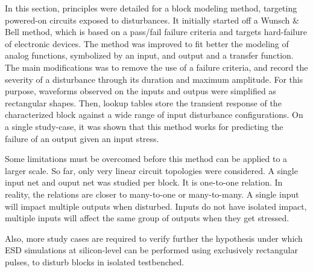 In this section, principles were detailed for a block modeling method, targeting powered-on circuits exposed to disturbances.
It initially started off a Wunsch & Bell method, which is based on a pass/fail failure criteria and targets hard-failure of electronic devices.
The method was improved to fit better the modeling of analog functions, symbolized by an input, and output and a transfer function.
The main modifications was to remove the use of a failure criteria, and record the severity of a disturbance through its duration and maximum amplitude.
For this purpose, waveforms observed on the inputs and outpus were simplified as rectangular shapes.
Then, lookup tables store the transient response of the characterized block against a wide range of input disturbance configurations.
On a single study-case, it was shown that this method works for predicting the failure of an output given an input stress.

Some limitations must be overcomed before this method can be applied to a larger scale.
So far, only very linear circuit topologies were considered.
A single input net and ouput net was studied per block.
It is one-to-one relation.
In reality, the relations are closer to many-to-one or many-to-many.
A single input will impact multiple outputs when disturbed.
Inputs do not have isolated impact, multiple inputs will affect the same group of outputs when they get stressed.

Also, more study cases are required to verify further the hypothesis under which ESD simulations at silicon-level can be performed using exclusively rectangular pulses, to disturb blocks in isolated testbenched.

